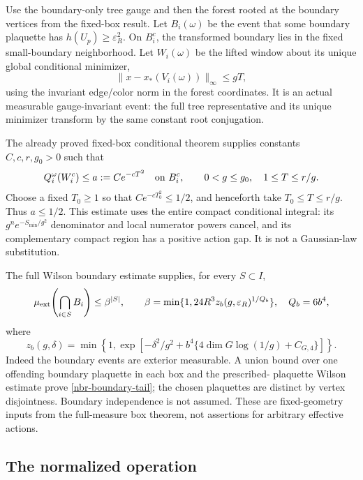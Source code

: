 Use the boundary-only tree gauge and then the forest rooted at the
boundary vertices from the fixed-box result. Let \(B_i(\omega)\) be
the event that some boundary plaquette has
\(h(U_p)\ge\varepsilon_R^2\). On \(B_i^c\), the transformed boundary
lies in the fixed small-boundary neighborhood. Let \(W_i(\omega)\)
be the lifted window about its unique global conditional minimizer,
\begin{equation}
 \|x-x_*(V_i(\omega))\|_\infty\le gT,
 \label{nbr-window}
\end{equation}
using the invariant edge/color norm in the forest coordinates.
It is an actual measurable gauge-invariant event: the full tree
representative and its unique minimizer transform by the same constant
root conjugation.

The already proved fixed-box conditional theorem supplies constants
\(C,c,r,g_0>0\) such that
\begin{equation}
 Q_i^\omega(W_i^c)\le a:=Ce^{-cT^2}\quad\hbox{on }B_i^c,
 \qquad 0<g\le g_0,\quad 1\le T\le r/g.
 \label{nbr-conditional-tail}
\end{equation}
Choose a fixed \(T_0\ge1\) so that \(Ce^{-cT_0^2}\le1/2\), and
henceforth take \(T_0\le T\le r/g\). Thus \(a\le1/2\).
This estimate uses the entire compact conditional integral: its
\(g^n e^{-S_{\min}/g^2}\) denominator and local numerator powers
cancel, and its complementary compact region has a positive action
gap. It is not a Gaussian-law substitution.

The full Wilson boundary estimate supplies, for every \(S\subset I\),
\begin{equation}
 \mu_{\rm ext}\!\left(\bigcap_{i\in S}B_i\right)
 \le\beta^{|S|},\qquad
 \beta=\min\{1,24R^3z_b(g,\varepsilon_R)^{1/Q_b}\},
 \quad Q_b=6b^4,
 \label{nbr-boundary-tail}
\end{equation}
where
\[
 z_b(g,\delta)=\min\left\{1,
 \exp\left[-\delta^2/g^2+
 b^4\{4\dim G\log(1/g)+C_{G,4}\}\right]\right\}.
\]
Indeed the boundary events are exterior measurable. A union bound over
one offending boundary plaquette in each box and the prescribed-
plaquette Wilson estimate prove \eqref{nbr-boundary-tail}; the chosen
plaquettes are distinct by vertex disjointness. Boundary independence
is not assumed. These are fixed-geometry inputs from the full-measure
box theorem, not assertions for arbitrary effective actions.

\subsection{The normalized operation}
\label{nbr-operation-section}

